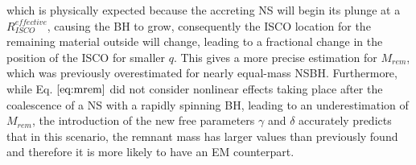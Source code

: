 \documentclass[binding=0.6cm, LaM]{sapthesis}
\begin{document}
	which is physically expected because the accreting NS will begin its plunge at a $R_{ISCO}^{effective}$,
	causing the BH to grow, consequently the ISCO location for the remaining material outside will change, 
	leading to a fractional change in the position of the ISCO for smaller $q$.	
	This gives a more precise estimation for $M_{rem}$, which was previously overestimated for nearly equal-mass NSBH.
	Furthermore, while Eq. $\ref{eq:mrem}$ did not consider nonlinear effects taking place after the coalescence of a NS
	with a rapidly spinning BH, leading to an underestimation of $M_{rem}$, 
	the introduction of the new free parameters $\gamma$ and $\delta$ accurately predicts that in this scenario, 
	the remnant mass has larger values than previously found and therefore it is more likely to have an EM counterpart.
\end{document}
